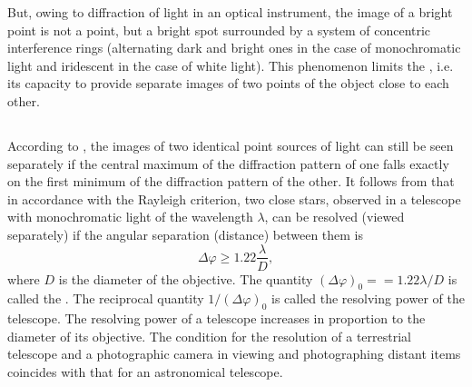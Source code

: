 But, owing to diffraction of light in an optical instrument, the image of a bright point is not a point, but a bright spot surrounded by a system of concentric interference rings (alternating dark and bright ones in the case of monochromatic light and iridescent in the case of white light). This phenomenon limits the , i.e. its capacity to provide separate images of two points of the object close to each other.

\subsection{}\label{33.5.2} According to , the images of two identical point sources of light can still be seen separately if the central maximum of the diffraction pattern of one falls exactly on the first minimum of the diffraction pattern of the other. It follows from  that in accordance with the Rayleigh
criterion, two close stars, observed in a telescope with monochromatic light of the wavelength $\lambda$, can be resolved (viewed separately) if the angular separation (distance) between them is 
\begin{equation*}%
\Delta \varphi \geqslant 1.22 \frac{\lambda}{D},
\end{equation*}
where $D$ is the diameter of the objective. The quantity $(\Delta \varphi)_{0} = = 1.22 \lambda/D$ is called the . The reciprocal quantity $1/(\Delta \varphi)_{0}$ is called the resolving power of the telescope. The resolving power of a telescope increases in proportion to the diameter of its objective. The condition for the resolution of a terrestrial telescope and a photographic camera in viewing and photographing distant items coincides with
that for an astronomical telescope.


